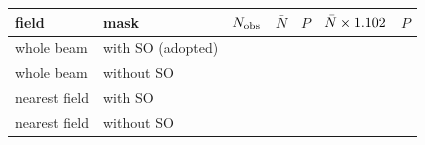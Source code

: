 \begin{tabular}{@{}llrrrrr@{}}
\hline
field & mask & $N_{\rm obs}$ & $\bar N$ & $P$ & $\bar N\times1.102$ & $P$ \\
\hline
whole beam & with SO (adopted) & \CeObs{} & \CeExp{} & \CeProbNull{} & \CeExpNear{} & \CeProbNear{} \\
whole beam & without SO & \MkNoSOObs{} & \MkNoSOExp{} & \MkNoSOProb{} & \CgExpWOSt{} & \CgProbWOSt{} \\
nearest field & with SO & \FrNarrowObs{} & \FrNarrowExp{} & \FrNarrowProb{} & \CgExpNSSt{} & \CgProbNSSt{} \\
nearest field & without SO & \CgObsNO{} & \CgExpNO{} & \CgProbNO{} & \CgExpNOSt{} & \CgProbNOSt{} \\
\hline
\end{tabular}
